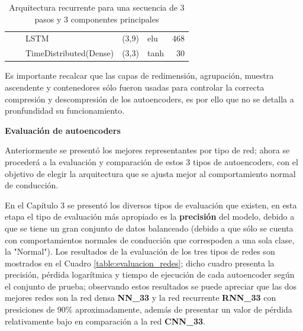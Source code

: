 \begin{table}[H]
\begin{center}
\begin{tabular}{ll|l|r|l|r|}
\multicolumn{1}{|l|}{}                              &                             & LSTM                               & (3,9)                                & elu                                     & 468                                         \\ \cline{3-6} 
\multicolumn{1}{|l|}{}                              &                             & TimeDistributed(Dense)             & (3,3)                                & tanh                                     & 30                                          \\ \hline
\end{tabular}
\end{center}
\caption{Arquitectura recurrente para una secuencia de 3 pasos y 3 componentes principales}
\label{table:rnn33}
\end{table}

Es importante recalcar que las capas de redimensi\'{o}n, agrupaci\'{o}n, muestra ascendente y contenedores s\'{o}lo fueron usadas para controlar la correcta compresi\'{o}n y descompresi\'{o}n de los autoencoders, es por ello que no se detalla a pronfundidad su funcionamiento.

\vspace{5mm} %

\textbf{Evaluaci\'{o}n de autoencoders}

\vspace{5mm} %

Anteriormente se present\'{o} los mejores representantes por tipo de red; ahora se proceder\'{a} a la evaluaci\'{o}n y comparaci\'{o}n de estos 3 tipos de autoencoders, con el objetivo de elegir la arquitectura que se ajusta mejor al comportamiento normal de conducci\'{o}n.

\vspace{5mm} %

En el Cap\'{i}tulo 3 se present\'{o} los diversos tipos de evaluaci\'{o}n que existen, en esta etapa el tipo de evaluaci\'{o}n m\'{a}s apropiado es la \textbf{precisi\'{o}n} del modelo, debido a que se tiene un gran conjunto de datos balanceado (debido a que s\'{o}lo se cuenta con comportamientos normales de conducci\'{o}n que correspoden a una sola clase, la "Normal"). Los resultados de la evaluaci\'{o}n de los tres tipos de redes son mostrados en el Cuadro \ref{table:evaluacion_redes}; dicho cuadro presenta la precisi\'{o}n, p\'{e}rdida logar\'{i}tmica y tiempo de ejecuci\'{o}n de cada autoencoder seg\'{u}n el conjunto de prueba; observando estos resultados se puede apreciar que las dos mejores redes son la red densa \textbf{NN\_33} y la red recurrente \textbf{RNN\_33} con presiciones de 90\% aproximadamente, adem\'{a}s de presentar un valor de p\'{e}rdida relativamente bajo en comparaci\'{o}n a la red \textbf{CNN\_33}.

